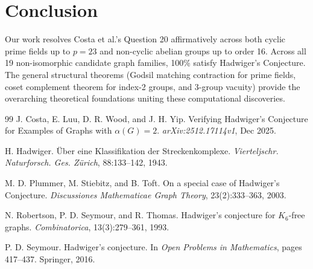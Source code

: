 \documentclass[11pt,a4paper]{article}
\theoremstyle{definition}
\begin{document}
\section{Conclusion}

Our work resolves Costa et al.'s Question 20 affirmatively across both cyclic prime fields up to $p = 23$ and non-cyclic abelian groups up to order 16. Across all 19 non-isomorphic candidate graph families, 100\% satisfy Hadwiger's Conjecture. The general structural theorems (Godsil matching contraction for prime fields, coset complement theorem for index-2 groups, and 3-group vacuity) provide the overarching theoretical foundations uniting these computational discoveries.

\begin{thebibliography}{99}
J. Costa, E. Luu, D. R. Wood, and J. H. Yip.
\newblock Verifying Hadwiger's Conjecture for Examples of Graphs with $\alpha(G) = 2$.
\newblock \emph{arXiv:2512.17114v1}, Dec 2025.

H. Hadwiger.
\newblock Über eine Klassifikation der Streckenkomplexe.
\newblock \emph{Vierteljschr. Naturforsch. Ges. Zürich}, 88:133--142, 1943.

M. D. Plummer, M. Stiebitz, and B. Toft.
\newblock On a special case of Hadwiger's Conjecture.
\newblock \emph{Discussiones Mathematicae Graph Theory}, 23(2):333--363, 2003.

N. Robertson, P. D. Seymour, and R. Thomas.
\newblock Hadwiger's conjecture for $K_6$-free graphs.
\newblock \emph{Combinatorica}, 13(3):279--361, 1993.

P. D. Seymour.
\newblock Hadwiger's conjecture.
\newblock In \emph{Open Problems in Mathematics}, pages 417--437. Springer, 2016.
\end{thebibliography}
\end{document}
